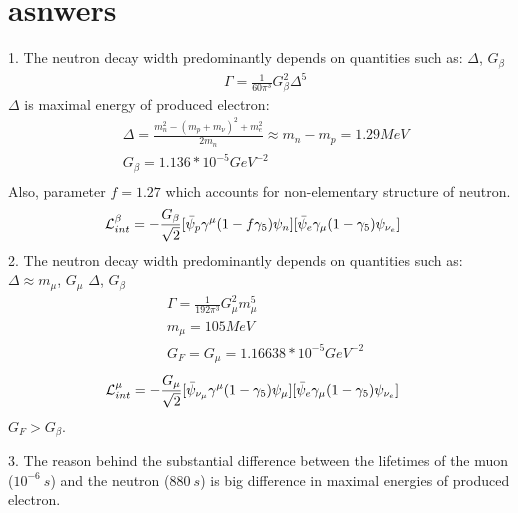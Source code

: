 \section*{asnwers}
1. The neutron decay width predominantly depends on quantities such as: $\Delta$, $G_\beta$
\begin{equation}
\begin{split}
&\Gamma = \frac{1}{60\pi^3}G_\beta^2 \Delta ^5
\end{split}
\end{equation}
$\Delta$ is maximal energy of produced electron: 
\begin{equation}
\begin{split}
&\Delta =\frac{m_n^2-(m_p+m_\nu)^2+m_e^2}{2m_n}\approx m_n-m_p=1.29 MeV\\
&G_\beta = 1.136*10^{-5}GeV^{-2}\\
\end{split}
\end{equation}
Also, parameter $f=1.27$ which accounts for non-elementary structure of neutron.
\begin{equation}
\begin{split}
&\mathcal{L}_{int}^\beta=-\frac{G_\beta}{\sqrt{2}}[\Bar{\psi}_p\gamma^\mu (1-f\gamma_5)\psi_n][\Bar{\psi}_e\gamma_\mu (1-\gamma_5)\psi_{\nu_e}]
\end{split}
\end{equation}
2. The neutron decay width predominantly depends on quantities such as: $\Delta\approx m_\mu$, $G_\mu$
$\Delta$, $G_\beta$
\begin{equation}
\begin{split}
&\Gamma = \frac{1}{192\pi^3}G_\mu^2 m_\mu ^5\\
&m_\mu = 105 MeV\\
&G_F=G_\mu=1.16638*10^{-5} GeV^{-2}
\end{split}
\end{equation}
\begin{equation}
\begin{split}
&\mathcal{L}_{int}^\mu=-\frac{G_\mu}{\sqrt{2}}[\Bar{\psi}_{\nu_\mu}\gamma^\mu (1-\gamma_5)\psi_\mu][\Bar{\psi}_e\gamma_\mu (1-\gamma_5)\psi_{\nu_e}]
\end{split}
\end{equation}
$G_F>G_\beta$.

3. The reason behind the substantial difference between the lifetimes of the muon ($10^{-6}\ s$) and the neutron ($880 \ s$) is big difference in maximal energies of produced electron. 


